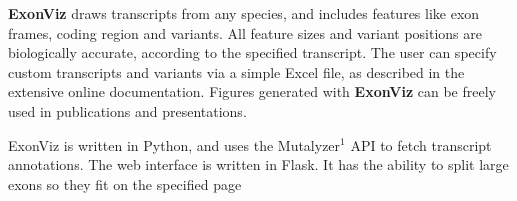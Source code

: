 \documentclass[portrait,a0paper,fontscale=0.31]{baposter}
\newcommand{\exonviz}{\textbf{ExonViz} }
\newcommand{\padd}{\vspace*{0.2cm}}
\begin{document}
\begin{poster}
   {
    \padd
    \noindent
    \exonviz draws transcripts from any species, and includes features
    like exon frames, coding region and variants. All feature sizes and variant
    positions are biologically accurate, according to the specified transcript.
    The user can specify custom transcripts and variants via a simple Excel
    file, as described in the extensive online documentation.
    \newline
    \newline
    \noindent
    Figures generated with \exonviz can be freely used in publications and
    presentations.
  }

   {
    \padd
    \noindent
    ExonViz is written in Python, and uses the Mutalyzer$^1$ API to fetch
    transcript annotations. The web interface is written in Flask.
    It has the ability to split large exons so they fit on the specified page
  }

   {
  \captionsetup{labelformat=empty,margin=0.6cm}
  }

   {
  \captionsetup{labelformat=empty,margin=0.6cm}
  }

   {
  \captionsetup{labelformat=empty,margin=0.6cm}
  }


\end{poster}
\end{document}
